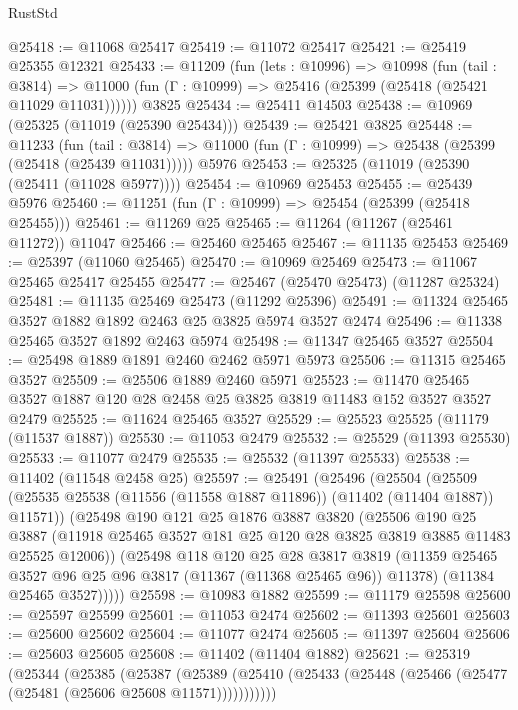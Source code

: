 \begin{lexlean}{RustStd}
\begin{coremodule}
@25418 := @11068 @25417
@25419 := @11072 @25417
@25421 := @25419 @25355 @12321
@25433 := @11209
    (fun (lets : @10996) =>
    @10998
      (fun (tail : @3814) =>
      @11000 (fun (Γ : @10999) => @25416 (@25399 (@25418 (@25421 @11029 @11031))))))
    @3825
@25434 := @25411 @14503
@25438 := @10969 (@25325 (@11019 (@25390 @25434)))
@25439 := @25421 @3825
@25448 := @11233
    (fun (tail : @3814) => @11000 (fun (Γ : @10999) => @25438 (@25399 (@25418 (@25439 @11031)))))
    @5976
@25453 := @25325 (@11019 (@25390 (@25411 (@11028 @5977))))
@25454 := @10969 @25453
@25455 := @25439 @5976
@25460 := @11251 (fun (Γ : @10999) => @25454 (@25399 (@25418 @25455)))
@25461 := @11269 @25
@25465 := @11264 (@11267 (@25461 @11272)) @11047
@25466 := @25460 @25465
@25467 := @11135 @25453
@25469 := @25397 (@11060 @25465)
@25470 := @10969 @25469
@25473 := @11067 @25465 @25417 @25455
@25477 := @25467 (@25470 @25473) (@11287 @25324)
@25481 := @11135 @25469 @25473 (@11292 @25396)
@25491 := @11324 @25465 @3527 @1882 @1892 @2463 @25 @3825 @5974 @3527 @2474
@25496 := @11338 @25465 @3527 @1892 @2463 @5974
@25498 := @11347 @25465 @3527
@25504 := @25498 @1889 @1891 @2460 @2462 @5971 @5973
@25506 := @11315 @25465 @3527
@25509 := @25506 @1889 @2460 @5971
@25523 := @11470 @25465 @3527 @1887 @120 @28 @2458 @25 @3825 @3819 @11483 @152 @3527 @3527 @2479
@25525 := @11624 @25465 @3527
@25529 := @25523 @25525 (@11179 (@11537 @1887))
@25530 := @11053 @2479
@25532 := @25529 (@11393 @25530)
@25533 := @11077 @2479
@25535 := @25532 (@11397 @25533)
@25538 := @11402 (@11548 @2458 @25)
@25597 := @25491
    (@25496
      (@25504
        (@25509 (@25535 @25538 (@11556 (@11558 @1887 @11896)) (@11402 (@11404 @1887)) @11571))
        (@25498
          @190
          @121
          @25
          @1876
          @3887
          @3820
          (@25506
            @190
            @25
            @3887
            (@11918 @25465 @3527 @181 @25 @120 @28 @3825 @3819 @3885 @11483 @25525 @12006))
          (@25498
            @118
            @120
            @25
            @28
            @3817
            @3819
            (@11359 @25465 @3527 @96 @25 @96 @3817 (@11367 (@11368 @25465 @96)) @11378)
            (@11384 @25465 @3527)))))
@25598 := @10983 @1882
@25599 := @11179 @25598
@25600 := @25597 @25599
@25601 := @11053 @2474
@25602 := @11393 @25601
@25603 := @25600 @25602
@25604 := @11077 @2474
@25605 := @11397 @25604
@25606 := @25603 @25605
@25608 := @11402 (@11404 @1882)
@25621 := @25319
    (@25344
      (@25385
        (@25387
          (@25389 (@25410 (@25433 (@25448 (@25466 (@25477 (@25481 (@25606 @25608 @11571)))))))))))

\end{coremodule}
\end{lexlean}
